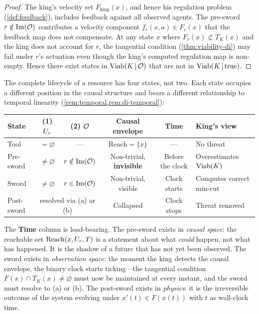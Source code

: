 \begin{proof}
The king's velocity set $F_{\mathrm{king}}(x)$, and hence his
regulation problem (\cref{def:feedback}), includes feedback against
all observed agents.  The pre-sword $r \notin \mathrm{Im}(\mathcal{O})$
contributes a velocity component $f_r(x, a) \in F_r(x)$ that the
feedback map does not compensate.  At any state $x$ where
$F_r(x) \not\subset T_K(x)$ and the king does not account for $r$,
the tangential condition (\cref{thm:viability-di}) may fail under
$r$'s actuation even though the king's computed regulation
map is non-empty.  Hence there exist states in $\mathrm{Viab}(K \,|\, \mathcal{O})$
that are not in $\mathrm{Viab}(K \,|\, \text{true})$.
\end{proof}

\begin{remark}\label{rem:sword-lifecycle}
The complete lifecycle of a resource has four states, not two.
Each state occupies a different position in the causal structure
and bears a different relationship to temporal linearity
(\cref{rem:temporal,rem:di-temporal}):
\begin{center}
\begin{tabular}{@{}lccccl@{}}
\toprule
\textbf{State} & \textbf{(1)} $U_r$ & \textbf{(2)} $\mathcal{O}$
& \textbf{Causal envelope} & \textbf{Time} & \textbf{King's view} \\
\midrule
Tool      & $= \varnothing$ & ---
& $\mathrm{Reach} = \{x\}$ & ---
& No threat \\
Pre-sword & $\neq \varnothing$ & $r \notin \mathrm{Im}(\mathcal{O})$
& Non-trivial, \textbf{invisible}
& Before the clock
& Overestimates $\mathrm{Viab}(K)$ \\
Sword     & $\neq \varnothing$ & $r \in \mathrm{Im}(\mathcal{O})$
& Non-trivial, visible
& Clock starts
& Computes correct min-cut \\
Post-sword & \multicolumn{2}{c}{resolved via (a) or (b)}
& Collapsed
& Clock stops
& Threat removed \\
\bottomrule
\end{tabular}
\end{center}
The \textbf{Time} column is load-bearing.  The pre-sword exists in
\emph{causal space}: the reachable set $\mathrm{Reach}(x, U_r, T)$
is a statement about what \emph{could} happen, not what has
happened.  It is the shadow of a future that has not yet been
observed.  The sword exists in \emph{observation space}: the moment
the king detects the causal envelope, the binary clock starts
ticking---the tangential condition $F(x) \cap T_K(x) \neq
\varnothing$ must now be maintained at every instant, and the
sword must resolve to (a) or (b).  The post-sword exists in
\emph{physics}: it is the irreversible outcome of the system
evolving under $x'(t) \in F(x(t))$ with $t$ as wall-clock time.


\end{remark}
